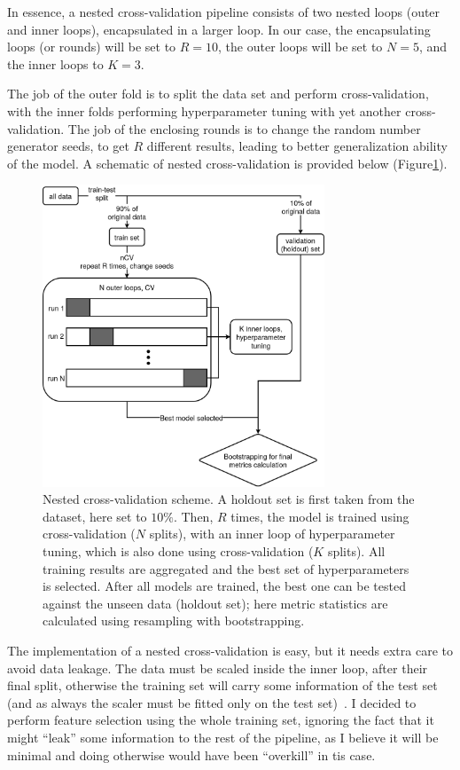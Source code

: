 \documentclass[12pt]{article}
\begin{document}
In essence, a nested cross-validation pipeline consists of two nested loops
(outer and inner loops), encapsulated in a larger loop. In our case, the
encapsulating loops (or rounds) will be set to $R=10$, the outer loops will be
set to $N=5$, and the inner loops to $K=3$.

The job of the outer fold is to split the data set and perform cross-validation,
with the inner folds performing hyperparameter tuning with yet another
cross-validation. The job of the enclosing rounds is to change the random number
generator seeds, to get $R$ different results, leading to better generalization
ability of the model. A schematic of nested cross-validation is provided below
(Figure\ref{fig:ncv_scheme}).

\begin{figure}[H]
    \centering
    \includegraphics[width=0.75\textwidth]{ims/nCV.drawio.png}
    \caption{Nested cross-validation scheme. A holdout set is first taken from
    the dataset, here set to $10\%$. Then, $R$ times, the model is trained
    using cross-validation ($N$ splits), with an inner loop of hyperparameter
    tuning, which is also done using cross-validation ($K$ splits). All
    training results are aggregated and the best set of hyperparameters
    is selected. After all models are trained, the best one can be tested
    against the unseen data (holdout set); here metric statistics are
    calculated using resampling with bootstrapping.}
    \label{fig:ncv_scheme}
\end{figure}

The implementation of a nested cross-validation is easy, but it needs extra
care to avoid data leakage. The data must be scaled inside the inner loop, after
their final split, otherwise the training set will carry some information of the
test set (and as always the scaler must be fitted only on the test
set)~\cite{Bates_2023}. I decided to perform feature selection using the whole
training set, ignoring the fact that it might ``leak'' some information to the
rest of the pipeline, as I believe it will be minimal and doing otherwise would
have been ``overkill'' in tis case.
\end{document}
